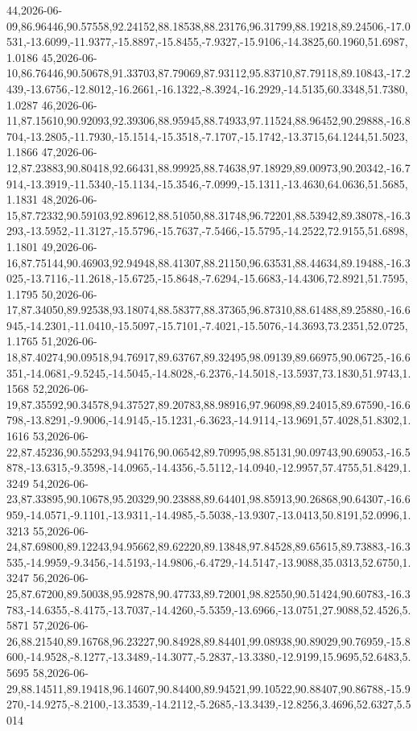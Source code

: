 \documentclass{eic-bcc-tcc}
\begin{document}
{44,2026-06-09,86.96446,90.57558,92.24152,88.18538,88.23176,96.31799,88.19218,89.24506,-17.0531,-13.6099,-11.9377,-15.8897,-15.8455,-7.9327,-15.9106,-14.3825,60.1960,51.6987,1.0186
45,2026-06-10,86.76446,90.50678,91.33703,87.79069,87.93112,95.83710,87.79118,89.10843,-17.2439,-13.6756,-12.8012,-16.2661,-16.1322,-8.3924,-16.2929,-14.5135,60.3348,51.7380,1.0287
46,2026-06-11,87.15610,90.92093,92.39306,88.95945,88.74933,97.11524,88.96452,90.29888,-16.8704,-13.2805,-11.7930,-15.1514,-15.3518,-7.1707,-15.1742,-13.3715,64.1244,51.5023,1.1866
47,2026-06-12,87.23883,90.80418,92.66431,88.99925,88.74638,97.18929,89.00973,90.20342,-16.7914,-13.3919,-11.5340,-15.1134,-15.3546,-7.0999,-15.1311,-13.4630,64.0636,51.5685,1.1831
48,2026-06-15,87.72332,90.59103,92.89612,88.51050,88.31748,96.72201,88.53942,89.38078,-16.3293,-13.5952,-11.3127,-15.5796,-15.7637,-7.5466,-15.5795,-14.2522,72.9155,51.6898,1.1801
49,2026-06-16,87.75144,90.46903,92.94948,88.41307,88.21150,96.63531,88.44634,89.19488,-16.3025,-13.7116,-11.2618,-15.6725,-15.8648,-7.6294,-15.6683,-14.4306,72.8921,51.7595,1.1795
50,2026-06-17,87.34050,89.92538,93.18074,88.58377,88.37365,96.87310,88.61488,89.25880,-16.6945,-14.2301,-11.0410,-15.5097,-15.7101,-7.4021,-15.5076,-14.3693,73.2351,52.0725,1.1765
51,2026-06-18,87.40274,90.09518,94.76917,89.63767,89.32495,98.09139,89.66975,90.06725,-16.6351,-14.0681,-9.5245,-14.5045,-14.8028,-6.2376,-14.5018,-13.5937,73.1830,51.9743,1.1568
52,2026-06-19,87.35592,90.34578,94.37527,89.20783,88.98916,97.96098,89.24015,89.67590,-16.6798,-13.8291,-9.9006,-14.9145,-15.1231,-6.3623,-14.9114,-13.9691,57.4028,51.8302,1.1616
53,2026-06-22,87.45236,90.55293,94.94176,90.06542,89.70995,98.85131,90.09743,90.69053,-16.5878,-13.6315,-9.3598,-14.0965,-14.4356,-5.5112,-14.0940,-12.9957,57.4755,51.8429,1.3249
54,2026-06-23,87.33895,90.10678,95.20329,90.23888,89.64401,98.85913,90.26868,90.64307,-16.6959,-14.0571,-9.1101,-13.9311,-14.4985,-5.5038,-13.9307,-13.0413,50.8191,52.0996,1.3213
55,2026-06-24,87.69800,89.12243,94.95662,89.62220,89.13848,97.84528,89.65615,89.73883,-16.3535,-14.9959,-9.3456,-14.5193,-14.9806,-6.4729,-14.5147,-13.9088,35.0313,52.6750,1.3247
56,2026-06-25,87.67200,89.50038,95.92878,90.47733,89.72001,98.82550,90.51424,90.60783,-16.3783,-14.6355,-8.4175,-13.7037,-14.4260,-5.5359,-13.6966,-13.0751,27.9088,52.4526,5.5871
57,2026-06-26,88.21540,89.16768,96.23227,90.84928,89.84401,99.08938,90.89029,90.76959,-15.8600,-14.9528,-8.1277,-13.3489,-14.3077,-5.2837,-13.3380,-12.9199,15.9695,52.6483,5.5695
58,2026-06-29,88.14511,89.19418,96.14607,90.84400,89.94521,99.10522,90.88407,90.86788,-15.9270,-14.9275,-8.2100,-13.3539,-14.2112,-5.2685,-13.3439,-12.8256,3.4696,52.6327,5.5014
}
\end{document}
